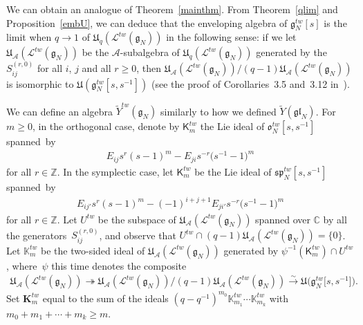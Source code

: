 \documentclass[11pt]{article}
\numberwithin{theorem}{section}
\numberwithin{proposition}{section}
\numberwithin{lemma}{section}
\numberwithin{corollary}{section}
\numberwithin{definition}{section}
\numberwithin{example}{section}
\numberwithin{remark}{section}
\numberwithin{note}{section}
\numberwithin{equation}{section}
\begin{document}
We can obtain an analogue of Theorem~\ref{mainthm}.
From Theorem~\ref{qlim} and Proposition~\ref{embU}, we can deduce that the enveloping algebra of
$\mathfrak{g}_N^{tw}[s]$ is the limit when $q\rightarrow 1$ of $\mathfrak{U}_q(\mathcal{L}^{tw}(\mathfrak{g}_N))$ in the
following sense: if we let $\mathfrak{U}_{\mathcal{A}}(\mathcal{L}^{tw}(\mathfrak{g}_N))$ be the
$\mathcal{A}$-subalgebra of $\mathfrak{U}_q(\mathcal{L}^{tw}(\mathfrak{g}_N))$ generated by the $S_{ij}^{(r,0)}$ for all
$i$, $j$ and all $r\ge 0$, then
$\mathfrak{U}_{\mathcal{A}}(\mathcal{L}^{tw}(\mathfrak{g}_N))/(q-1)\mathfrak{U}_{\mathcal{A}}(\mathcal{L}^{tw}(\mathfrak{g}_N))$
is isomorphic to $\mathfrak{U}(\mathfrak{g}_N^{tw}[s,s^{-1}])$ (see the proof of Corollaries~3.5 and~3.12
in~\cite{MRS}).

We can def\/ine an algebra $\widetilde{Y}^{tw}(\mathfrak{g}_N)$ similarly to how we def\/ined
$\widetilde{Y}(\mathfrak{gl}_N)$.
For $m\ge 0$, in the orthogonal case, denote by $\mathsf{K}_m^{tw}$ the Lie ideal of $\mathfrak{o}_N^{tw}[s,s^{-1}]$
spanned~by
\begin{gather*}
E_{ij} s^r(s-1)^m - E_{ji} s^{-r} \big(s^{-1}-1\big)^m
\end{gather*}
for all $r \in \mathbb{Z}$.
In the symplectic case, let $\mathsf{K}_m^{tw}$ be the Lie ideal of $\mathfrak{sp}_N^{tw}[s,s^{-1}]$ spanned~by
\begin{gather*}
E_{ij'}s^r(s-1)^m - (-1)^{i+j+1} E_{ji'} s^{-r}\big(s^{-1}-1\big)^m
\end{gather*}
for all $r \in \mathbb{Z}$.
Let $U^{tw}$ be the subspace of $\mathfrak{U}_{\mathcal{A}}(\mathcal{L}^{tw}(\mathfrak{g}_N))$ spanned over $\mathbb{C}$
by all the genera\-tors~$S_{ij}^{(r,0)}$, and observe that $U^{tw}\cap
(q-1)\mathfrak{U}_{\mathcal{A}}(\mathcal{L}^{tw}(\mathfrak{g}_N)) = \{0 \}$.
Let $\mathbb{K}_m^{tw}$ be the two-sided ideal of $\mathfrak{U}_{\mathcal{A}}(\mathcal{L}^{tw}(\mathfrak{g}_N))$
generated by $\psi^{-1}(\mathsf{K}_m^{tw})\cap U^{tw}$, where~$\psi$ this time denotes the composite
\begin{gather*}
\mathfrak{U}_{\mathcal{A}}(\mathcal{L}^{tw}(\mathfrak{g}_N)) \twoheadrightarrow
\mathfrak{U}_{\mathcal{A}}(\mathcal{L}^{tw}(\mathfrak{g}_N))/(q-1)\mathfrak{U}_{\mathcal{A}}(\mathcal{L}^{tw}(\mathfrak{g}_N))
\stackrel{\sim}{\longrightarrow} \mathfrak{U}\big(\mathfrak{g}_N^{tw}\big[s,s^{-1}\big]\big).
\end{gather*}
Set $\mathbf{K}_m^{tw}$ equal to the sum of the ideals $(q-q^{-1})^{m_0} \mathbb{K}_{m_1}^{tw}\cdots
\mathbb{K}_{m_k}^{tw}$ with $m_0+m_1+\cdots + m_k \geq m$.
\end{document}
